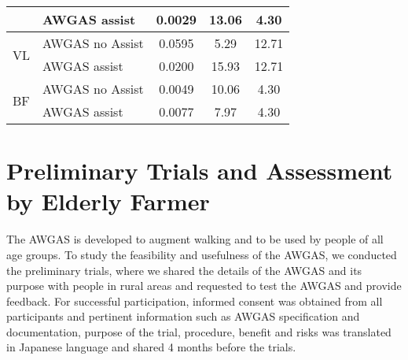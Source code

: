 \documentclass[paper,JRM,paper]{jaciiiarticle}
\begin{document}
\begin{table}[h]
{\begin{tabular}{@{}llccc@{}}
		& AWGAS assist                   & 0.0029  & 13.06   & 4.30                                                           \\ \midrule
		\multirow{2}{*}{VL}  & AWGAS no Assist                & 0.0595  & 5.29    & 12.71                                                          \\ 
		& AWGAS assist                   & 0.0200  & 15.93   & 12.71                                                          \\ \midrule
		\multirow{2}{*}{BF}  & AWGAS no Assist                & 0.0049  & 10.06   & 4.30                                                           \\ 
		& AWGAS assist                   & 0.0077  & 7.97    & 4.30                                                           \\ \bottomrule
	\end{tabular}
	}

	\label{ttestresult}
\end{table}

\section{Preliminary Trials and Assessment by Elderly Farmer}

The AWGAS is developed to augment walking and to be used by people of all age groups. To study the feasibility and usefulness of the AWGAS, we conducted the preliminary trials, where we shared the details of the AWGAS and its purpose with people in rural areas and requested to test the AWGAS and provide feedback. For successful participation, informed consent was obtained from all participants and pertinent information such as AWGAS specification and documentation, purpose of the trial, procedure, benefit and risks was translated in Japanese language and shared 4 months before the trials. 
\end{document}
